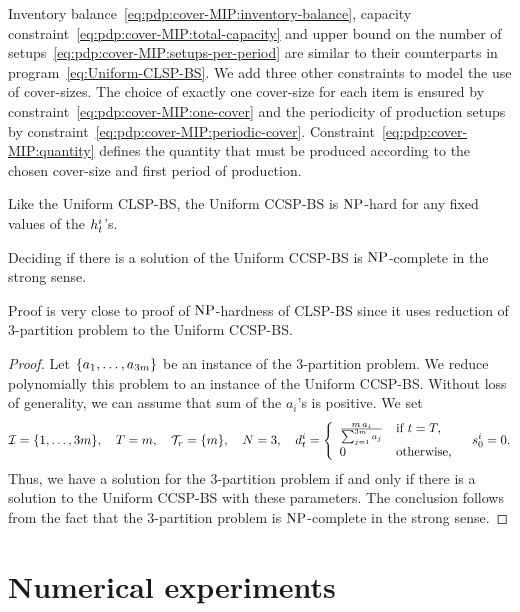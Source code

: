 Inventory balance~\eqref{eq:pdp:cover-MIP:inventory-balance}, capacity constraint~\eqref{eq:pdp:cover-MIP:total-capacity} and upper bound on the number of setups~\eqref{eq:pdp:cover-MIP:setups-per-period} are similar to their counterparts in program~\eqref{eq:Uniform-CLSP-BS}.
We add three other constraints to model the use of cover-sizes.
The choice of exactly one cover-size for each item is ensured by constraint~\eqref{eq:pdp:cover-MIP:one-cover} and the periodicity of production setups by constraint~\eqref{eq:pdp:cover-MIP:periodic-cover}.
Constraint~\eqref{eq:pdp:cover-MIP:quantity} defines the quantity that must be produced according to the chosen cover-size and first period of production.


\medskip


Like the Uniform CLSP-BS, the Uniform CCSP-BS is $\operatorname{NP}$-hard for any fixed values of the $h_t^i$'s.

\begin{thm}
  Deciding if there is a solution of the Uniform CCSP-BS is $\operatorname{NP}$-complete in the strong sense.
\end{thm}


Proof is very close to proof of $\operatorname{NP}$-hardness of CLSP-BS since it uses reduction of 3-partition problem to the Uniform CCSP-BS.


\begin{proof}
Let $\crbracket{a_1,\ldots,a_{3m}}$ be an instance of the 3-partition problem.
We reduce polynomially this problem to an instance of the Uniform CCSP-BS.
Without loss of generality, we can assume that sum of the $a_i$'s is positive.
We set
\begin{equation}
  \REF=\range[1]{3m}
  ,\quad
  \horizon=m
  ,\quad
  \coverset_r=\crbracket{m}
  ,\quad
  \nbsetups=3
  ,\quad
  \demand_t^i
  =\left\{
  \begin{array}{ll}
  \frac{m\,a_i}{\sum_{j=1}^{3m}a_j} & \mbox{if}\ t=\horizon,
  \\
  0 & \mbox{otherwise,}\end{array}
  \right.
  \quad
  \inventory_0^i=0.
\end{equation}
Thus, we have a solution for the 3-partition problem if and only if there is a solution to the Uniform CCSP-BS with these parameters. The conclusion follows from the fact that the 3-partition problem is $\operatorname{NP}$-complete in the strong sense.
\end{proof}


\section{Numerical experiments}
\label{sec:pdp-cover:numerical-experiments}


